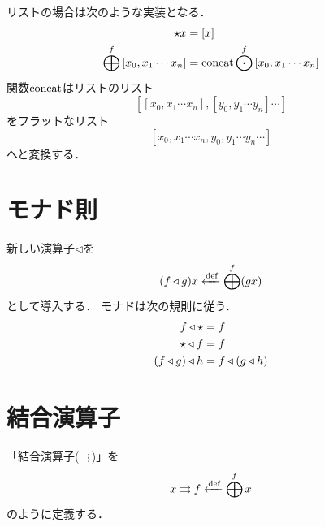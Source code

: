 \documentclass[twocolumn]{jsbook}
\newcommand{\typename}[1]{\mathbf{#1}}
\newcommand{\listtype}[1]{\left[#1\right]}
\begin{document}
% 
% 
% 

リストの場合は次のような実装となる．
\begin{align*}
\unit x&=\listtype{x}\\
\monadfunc^f\listtype{x_0,x_1\dotsb x_n}&=\concat\mapfunc^f\listtype{x_0,x_1\dotsb x_n}
\end{align*}
関数$\mathop{\text{concat}}$はリストのリスト$$\listtype{\listtype{x_0,x_1\dotsb x_n},\listtype{y_0,y_1\dotsb y_n}\dotsb}$$をフラットなリスト$$\listtype{x_0,x_1\dotsb x_n,y_0,y_1\dotsb y_n\dotsb}$$へと変換する．




\section{モナド則}

新しい演算子$\triangleleft$を$$(f\triangleleft g)x\xleftarrow{\text{def}}\bigoplus^f(gx)$$として導入する．
モナドは次の規則に従う．
\begin{align}
f\triangleleft\star&=f\\
\star\triangleleft f&=f\\
(f\triangleleft g)\triangleleft h&=f\triangleleft(g\triangleleft h)
\end{align}

\section{結合演算子}

「結合演算子($\rightrightarrows$)」を$$x\rightrightarrows f\xleftarrow{\text{def}} \bigoplus^fx$$のように定義する．
\end{document}
